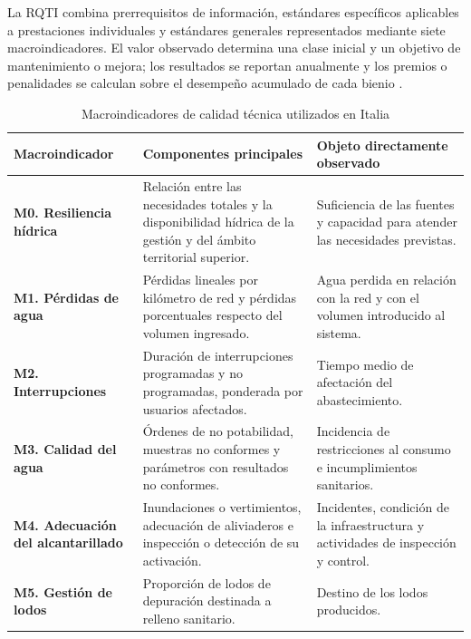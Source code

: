 La RQTI combina prerrequisitos de información, estándares específicos aplicables a prestaciones individuales y estándares generales representados mediante siete macroindicadores. El valor observado determina una clase inicial y un objetivo de mantenimiento o mejora; los resultados se reportan anualmente y los premios o penalidades se calculan sobre el desempeño acumulado de cada bienio \citep{ARERA2017RQTI,ARERA2023RQTI}.

\begin{table}[!t]
\centering
\caption{Macroindicadores de calidad técnica utilizados en Italia}
\label{tab:italia_desagregacion_macroindicadores}
\scriptsize
\renewcommand{\arraystretch}{1.20}
\setlength{\tabcolsep}{5pt}
\begin{tabularx}{\textwidth}{
>{\raggedright\arraybackslash}p{2.65cm}
>{\raggedright\arraybackslash}p{5.55cm}
>{\raggedright\arraybackslash}X}
\hline
\textbf{Macroindicador} &
\textbf{Componentes principales} &
\textbf{Objeto directamente observado} \\
\hline

\textbf{M0. Resiliencia hídrica}
&
Relación entre las necesidades totales y la disponibilidad hídrica de la gestión y del ámbito territorial superior.
&
Suficiencia de las fuentes y capacidad para atender las necesidades previstas.
\\

\textbf{M1. Pérdidas de agua}
&
Pérdidas lineales por kilómetro de red y pérdidas porcentuales respecto del volumen ingresado.
&
Agua perdida en relación con la red y con el volumen introducido al sistema.
\\

\textbf{M2. Interrupciones}
&
Duración de interrupciones programadas y no programadas, ponderada por usuarios afectados.
&
Tiempo medio de afectación del abastecimiento.
\\

\textbf{M3. Calidad del agua}
&
Órdenes de no potabilidad, muestras no conformes y parámetros con resultados no conformes.
&
Incidencia de restricciones al consumo e incumplimientos sanitarios.
\\

\textbf{M4. Adecuación del alcantarillado}
&
Inundaciones o vertimientos, adecuación de aliviaderos e inspección o detección de su activación.
&
Incidentes, condición de la infraestructura y actividades de inspección y control.
\\

\textbf{M5. Gestión de lodos}
&
Proporción de lodos de depuración destinada a relleno sanitario.
&
Destino de los lodos producidos.
\\


\end{tabularx}
\end{table}
